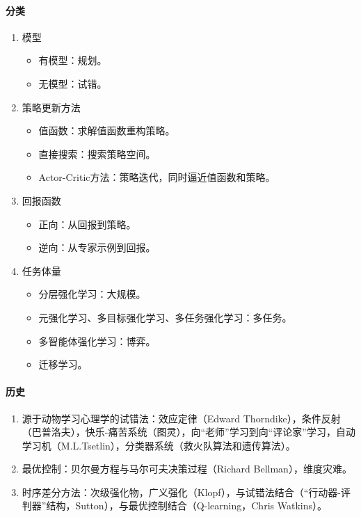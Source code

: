 \documentclass[
12pt, %
a4paper, 
oneside, %
headinclude,footinclude, %
]{scrartcl}
\begin{document}
\paragraph{分类}
\begin{enumerate}
\item 模型
\begin{itemize}
\item 有模型：规划。
\item 无模型：试错。
\end{itemize}
\item 策略更新方法
\begin{itemize}
\item 值函数：求解值函数重构策略。
\item 直接搜索：搜索策略空间。
\item Actor-Critic方法：策略迭代，同时逼近值函数和策略。
\end{itemize}
\item 回报函数
\begin{itemize}
\item 正向：从回报到策略。
\item 逆向：从专家示例到回报。
\end{itemize}
\item 任务体量
\begin{itemize}
\item 分层强化学习：大规模。
\item 元强化学习、多目标强化学习、多任务强化学习：多任务。
\item 多智能体强化学习：博弈。
\item 迁移学习。
\end{itemize}
\end{enumerate}
\paragraph{历史}
\begin{enumerate}
\item 源于动物学习心理学的试错法：效应定律（Edward Thorndike），条件反射（巴普洛夫），快乐-痛苦系统（图灵），向“老师”学习到向“评论家”学习，自动学习机（M.L.Tsetlin），分类器系统（救火队算法和遗传算法）。
\item 最优控制：贝尔曼方程与马尔可夫决策过程（Richard Bellman），维度灾难。
\item 时序差分方法：次级强化物，广义强化（Klopf），与试错法结合（“行动器-评判器”结构，Sutton），与最优控制结合（Q-learning，Chris Watkins）。
\end{enumerate}
\end{document}
